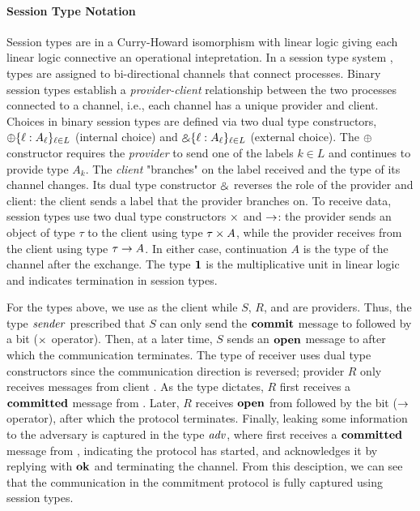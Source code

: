 \paragraph*{\textbf{Session Type Notation}}
Session types are in a Curry-Howard isomorphism \cite{caires2010session} with
linear logic \cite{girard1987linear} giving each linear logic connective
an operational intepretation.
In a session type system \cite{HondaCONCUR1993,Scalas19POPL,HondaPOPL2008},
types are assigned to bi-directional channels that connect processes.
Binary session types \cite{PfenningFOSSACS2015,Das20FSCD}
establish a \emph{provider-client} relationship between the two processes connected
to a channel, i.e., each channel has a unique provider and client.
Choices in binary session types are defined via two dual type constructors,
$\oplus \{ \ell : A_\ell \}_{\ell \in L}$ (internal choice) and $\mathbin{\binampersand} \{ \ell : A_\ell \}_{\ell \in L}$
(external choice).
The $\oplus$ constructor requires the \emph{provider} to send one of the labels $k \in L$
and continues to provide type $A_k$. 
The \emph{client} "branches" on the label received and the type of its channel changes.
Its dual type constructor $\mathbin{\binampersand}$ reverses the role of the provider and client:
the client sends a label that the provider branches on.
To receive data, session types use two dual type constructors $\times$ and $\rightarrow$:
the provider sends an object of type $\tau$ to the client using type $\tau \times A$,
while the provider receives from the client using type $\tau \rightarrow A$.
In either case, continuation $A$ is the type of the channel after the exchange.
The type $\mathbf{1}$ is the multiplicative unit in linear logic and indicates
termination in session types.

For the types above, we use \Fcom as the client while $S$, $R$, and \A are providers.
Thus, the type $\relax{\it sender}$ prescribed that $S$ can only send the $\mathbf{commit}$ message to \Fcom
followed by a bit ($\times$ operator).
Then, at a later time, $S$ sends an $\mathbf{open}$ message to \Fcom after which the communication terminates.
The type of receiver uses dual type constructors since the communication direction is reversed;
provider $R$ only receives messages from client \Fcom.
As the type dictates, $R$ first receives a $\mathbf{committed}$ message from \Fcom.
Later, $R$ receives $\mathbf{open}$ from \Fcom followed by the bit ($\rightarrow$ operator), after
which the protocol terminates.
Finally, \Fcom leaking some information to the adversary is captured in the type $\relax{\it adv}$, where \A first receives
a $\mathbf{committed}$ message from \Fcom, indicating the protocol has started, and acknowledges it by replying with $\mathbf{ok}$
and terminating the channel.
From this desciption, we can see that the communication in the commitment protocol is fully captured
using session types.

